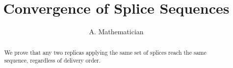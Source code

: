 \documentclass{amsart}
\title{Convergence of Splice Sequences}
\author{A. Mathematician}
\theoremstyle{definition}
\begin{document}
\begin{abstract}
We prove that any two replicas applying the same set of splices reach the same
sequence, regardless of delivery order.
\end{abstract}

\maketitle




\printbibliography
\end{document}
